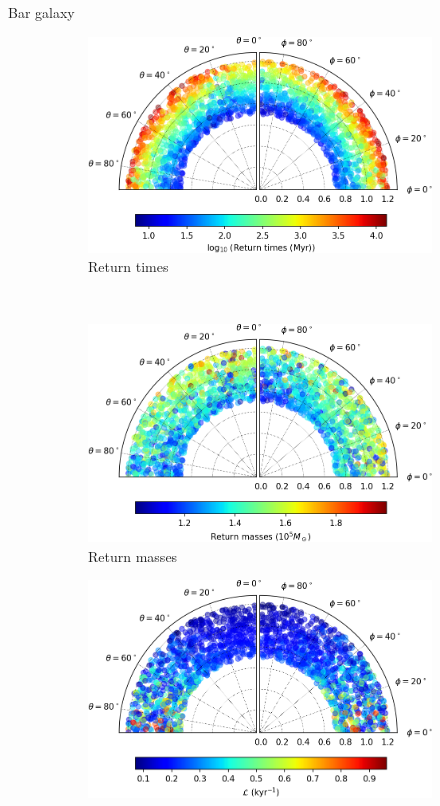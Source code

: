 \documentclass{beamer}
\begin{document}
\begin{frame}{Bar galaxy}
	\begin{figure}[h]
		\centering
		\begin{subfigure}[t]{0.35\textwidth}
			\includegraphics[width = \textwidth]{"../Files/Week 13/images/22_time"}
			\caption{Return times}
		\end{subfigure}
		~ 
		\begin{subfigure}[t]{0.35\textwidth}
			\includegraphics[width=\textwidth]{"../Files/Week 13/images/22_mass"}
			\caption{Return masses}
		\end{subfigure}
		\begin{subfigure}[t]{0.35\textwidth}
			\includegraphics[width=\textwidth]{"../Files/Week 13/images/22_lyapunov"}

\end{subfigure}
\end{figure}
\end{frame}
\end{document}
